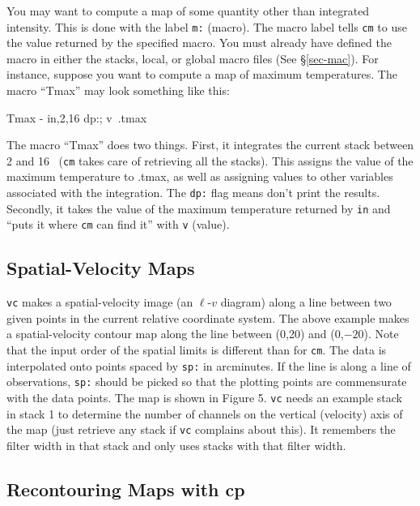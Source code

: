 You may want to compute a map of some quantity other than integrated
intensity. This is done with the label {\tt m:} (macro). The macro label  
tells {\tt cm} to use the value returned by the specified macro.
You must already have defined the macro in either the stacks, local, or
global macro files (See \S \ref{sec-mac}).
For instance, suppose you want to compute a map of maximum temperatures.
\smallskip
{}
\smallskip\noindent
The macro ``Tmax'' may look something like this:
\begin{description}
\item Tmax - in,2,16 dp:; v\ .tmax
\end{description}
\noindent
The macro ``Tmax'' does two things. First, it integrates the current stack
between 2 and 16 \kms\ ({\tt cm} takes care of retrieving all the stacks).
This assigns the value of the maximum temperature to .tmax, as well as assigning
values to other variables associated with the integration. 
The {\tt dp:} flag means don't print the results.
Secondly, it takes the value of the maximum temperature returned by {\tt in}
and ``puts it where {\tt cm} can find it'' with {\tt v} (value).

\subsection{Spatial-Velocity Maps}

{\tt vc} makes a spatial-velocity image (\eg an $\ell$-$v$ diagram) 
along a line between two given points in the current relative coordinate system.  
\smallskip
{}
\smallskip\noindent
The above example makes a spatial-velocity contour map along the line
between (0,20) and (0,$-20$). Note that the input order of the spatial limits 
is different than for {\tt cm}.  The data is interpolated
onto points spaced by {\tt sp:} in arcminutes. If the line is
along a line of observations, {\tt sp:} should be picked so that the plotting
points are commensurate with the data points. The map is shown in Figure 5.  
{\tt vc} needs an example stack in stack 1 to determine the number of
channels on the vertical (velocity) axis of the map (just retrieve any stack
if {\tt vc} complains about this).  It remembers the
filter width in that stack and only uses stacks with that filter
width.

\subsection{Recontouring Maps with {\twelvett cp}}


